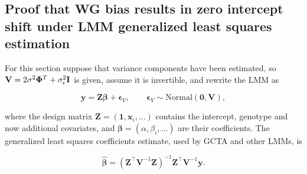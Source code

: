 \documentclass[11pt]{article}
\newcommand{\kinMat}[1][T]{%
  \ensuremath{%
    \mathbf{\Phi}^{#1}
  }%
  \xspace%
}%
\begin{document}
\begin{linenumbers}
\begin{appendices}
  \section{Proof that WG bias results in zero intercept shift under LMM generalized least squares estimation}

  \label{sec:wg_gls}

  For this section suppose that variance components have been estimated, so $\mathbf{V} = 2 \sigma^2 \kinMat + \sigma^2_\epsilon \mathbf{I}$ is given, assume it is invertible, and rewrite the LMM as
  \begin{linenomath*}
  $$
  \mathbf{y}
  =
  \mathbf{Z} \boldsymbol{\beta} + \boldsymbol{\epsilon}_V,
  \quad\quad
  \boldsymbol{\epsilon}_V \sim \text{Normal} \left( \mathbf{0}, \mathbf{V} \right),
  $$
  \end{linenomath*}
  where the design matrix $\mathbf{Z} = (\mathbf{1}, \mathbf{x}_i, ...)$ contains the intercept, genotype and now additional covariates, and $\boldsymbol{\beta} = (\alpha, \beta_i, ...)$ are their coefficients.
  The generalized least squares coefficients estimate, used by GCTA and other LMMs, is
  \begin{linenomath*}
  $$
  \boldsymbol{\hat{\beta}} = \left( \mathbf{Z}^\intercal \mathbf{V}^{-1} \mathbf{Z} \right)^{-1} \mathbf{Z}^\intercal \mathbf{V}^{-1} \mathbf{y}.
  $$
  \end{linenomath*}


\end{appendices}
\end{linenumbers}
\end{document}
